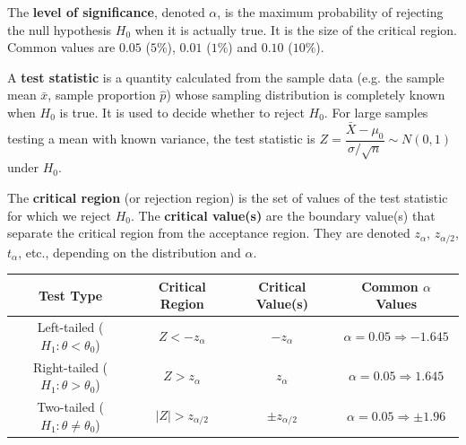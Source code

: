 \documentclass[11pt]{article}
\begin{document}
\begin{definition}
The \textbf{level of significance}, denoted $\alpha$, is the maximum probability of rejecting the null hypothesis $H_0$ when it is actually true. It is the size of the critical region. Common values are $0.05$ ($5\%$), $0.01$ ($1\%$) and $0.10$ ($10\%$).
\end{definition}

\begin{definition}
A \textbf{test statistic} is a quantity calculated from the sample data (e.g. the sample mean $\bar{x}$, sample proportion $\hat{p}$) whose sampling distribution is completely known when $H_0$ is true. It is used to decide whether to reject $H_0$. For large samples testing a mean with known variance, the test statistic is $Z = \dfrac{\bar{X} - \mu_0}{\sigma/\sqrt{n}} \sim N(0,1)$ under $H_0$.
\end{definition}

\begin{definition}
The \textbf{critical region} (or rejection region) is the set of values of the test statistic for which we reject $H_0$. The \textbf{critical value(s)} are the boundary value(s) that separate the critical region from the acceptance region. They are denoted $z_\alpha$, $z_{\alpha/2}$, $t_\alpha$, etc., depending on the distribution and $\alpha$.
\end{definition}

\begin{aretenir}
\begin{center}
\begin{tabular}{|c|c|c|c|}
\hline
\textbf{Test Type} & \textbf{Critical Region} & \textbf{Critical Value(s)} & \textbf{Common $\alpha$ Values} \\
\hline
Left-tailed ($H_1: \theta < \theta_0$) & $Z < -z_\alpha$ & $-z_\alpha$ & $\alpha=0.05 \Rightarrow -1.645$ \\
\hline
Right-tailed ($H_1: \theta > \theta_0$) & $Z > z_\alpha$ & $z_\alpha$ & $\alpha=0.05 \Rightarrow 1.645$ \\
\hline
Two-tailed ($H_1: \theta \neq \theta_0$) & $|Z| > z_{\alpha/2}$ & $\pm z_{\alpha/2}$ & $\alpha=0.05 \Rightarrow \pm 1.96$ \\
\hline
\end{tabular}
\end{center}
\end{aretenir}
\end{document}
